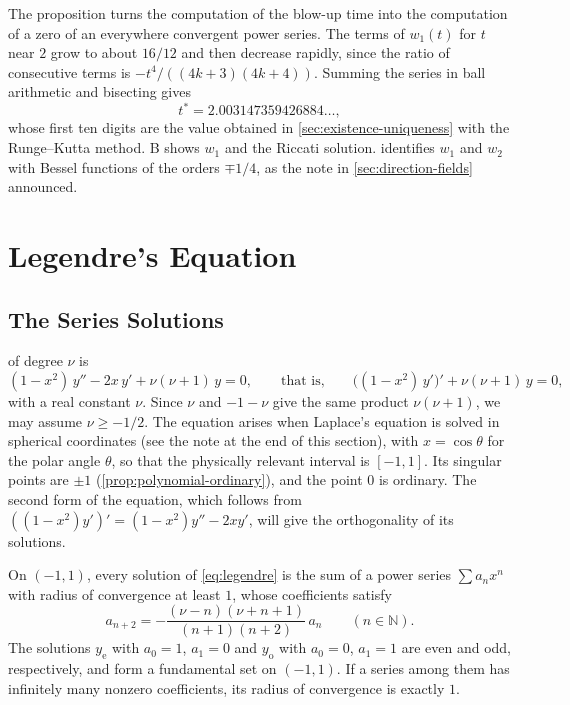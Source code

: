 The proposition turns the computation of the blow-up time into the computation of a zero of an everywhere convergent power series. The terms of $w_1(t)$ for $t$ near $2$ grow to about $16/12$ and then decrease rapidly, since the ratio of consecutive terms is $-t^4/((4k+3)(4k+4))$. Summing the series in ball arithmetic and bisecting gives
\[
t^*=2.003147359426884\ldots,
\]
whose first ten digits are the value obtained in \cref{sec:existence-uniqueness} with the Runge--Kutta method. B shows $w_1$ and the Riccati solution.  identifies $w_1$ and $w_2$ with Bessel functions of the orders $\mp1/4$, as the note in \cref{sec:direction-fields} announced.

\section{Legendre's Equation}
\label{sec:legendre}

\subsection{The Series Solutions}

 of degree $\nu$ is
\begin{equation}
(1-x^2)\,y''-2x\,y'+\nu(\nu+1)\,y=0,\qquad\text{that is,}\qquad\bigl((1-x^2)\,y'\bigr)'+\nu(\nu+1)\,y=0 ,
\label{eq:legendre}
\end{equation}
with a real constant $\nu$. Since $\nu$ and $-1-\nu$ give the same product $\nu(\nu+1)$, we may assume $\nu\ge-1/2$. The equation arises when Laplace's equation is solved in spherical coordinates (see the note at the end of this section), with $x=\cos\theta$ for the polar angle $\theta$, so that the physically relevant interval is $[-1,1]$. Its singular points are $\pm1$ (\cref{prop:polynomial-ordinary}), and the point $0$ is ordinary. The second form of the equation, which follows from $((1-x^2)y')'=(1-x^2)y''-2xy'$, will give the orthogonality of its solutions.

\begin{proposition}
\label{prop:legendre-series}
On $(-1,1)$, every solution of \eqref{eq:legendre} is the sum of a power series $\sum a_nx^n$ with radius of convergence at least $1$, whose coefficients satisfy
\begin{equation}
a_{n+2}=-\frac{(\nu-n)(\nu+n+1)}{(n+1)(n+2)}\,a_n\qquad(n\in\mathbb N).
\label{eq:legendre-recurrence}
\end{equation}
The solutions $y_{\mathrm e}$ with $a_0=1$, $a_1=0$ and $y_{\mathrm o}$ with $a_0=0$, $a_1=1$ are even and odd, respectively, and form a fundamental set on $(-1,1)$. If a series among them has infinitely many nonzero coefficients, its radius of convergence is exactly $1$.
\end{proposition}

